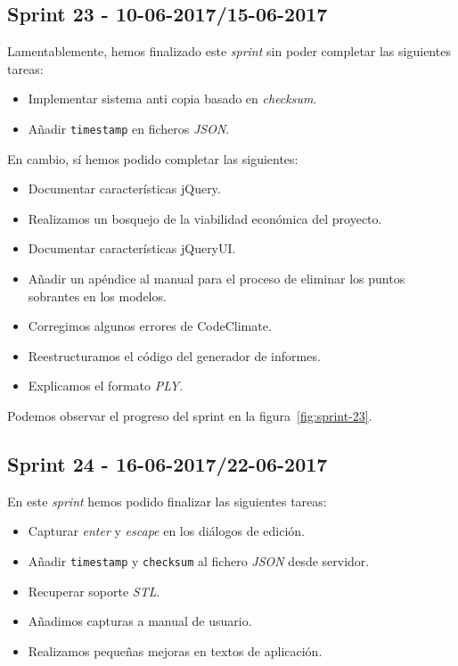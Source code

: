 \subsection{Sprint 23 - 10-06-2017/15-06-2017}
Lamentablemente, hemos finalizado este \textit{sprint} sin poder completar las siguientes tareas:
\begin{itemize}
	\item Implementar sistema anti copia basado en \textit{checksum}.
	\item Añadir \texttt{timestamp} en ficheros \textit{JSON}.
\end{itemize}

En cambio, sí hemos podido completar las siguientes:
\begin{itemize}
	\item Documentar características jQuery.
	\item Realizamos un bosquejo de la viabilidad económica del proyecto.
	\item Documentar características jQueryUI.
	\item Añadir un apéndice al manual para el proceso de eliminar los puntos sobrantes en los modelos.
	\item Corregimos algunos errores de CodeClimate.
	\item Reestructuramos el código del generador de informes.
	\item Explicamos el formato \textit{PLY}.
\end{itemize}

Podemos observar el progreso del sprint en la figura~\ref{fig:sprint-23}.

\subsection{Sprint 24 - 16-06-2017/22-06-2017}
En este \textit{sprint} hemos podido finalizar las siguientes tareas:
\begin{itemize}
	\item Capturar \textit{enter} y \textit{escape} en los diálogos de edición.
	\item Añadir \texttt{timestamp} y \texttt{checksum} al fichero \textit{JSON} desde servidor.
	\item Recuperar soporte \textit{STL}.
	\item Añadimos capturas a manual de usuario.
	\item Realizamos pequeñas mejoras en textos de aplicación.
\end{itemize}

